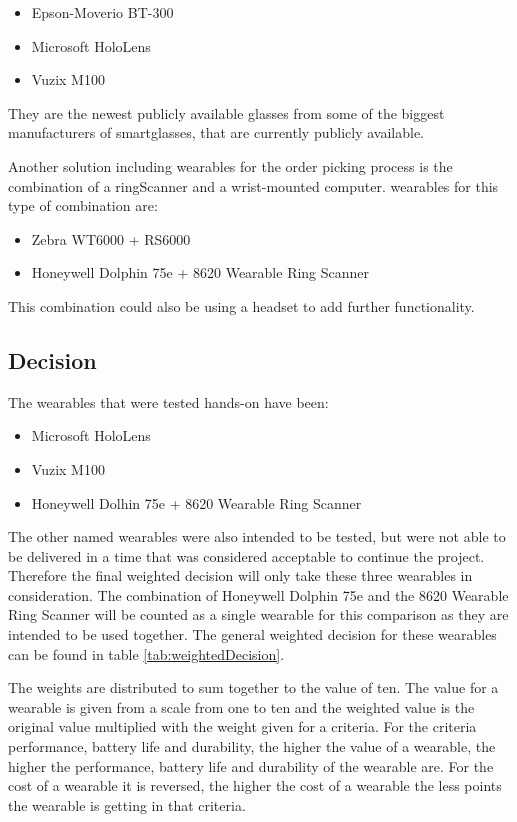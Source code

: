 \begin{itemize}
	\item Epson-Moverio BT-300
	\item Microsoft HoloLens
	\item Vuzix M100
\end{itemize}

They are the newest publicly available glasses from some of the biggest manufacturers of \gls{smartglasses}, that are currently publicly available.

Another solution including wearables for the order picking process is the combination of a \gls{ringScanner} and a wrist-mounted computer. \Gls{wearable}s for this type of combination are:

\begin{itemize}
	\item Zebra WT6000 + RS6000
	\item Honeywell Dolphin 75e + 8620 Wearable Ring Scanner
\end{itemize}

This combination could also be using a headset to add further functionality.

\subsection{Decision}

The wearables that were tested hands-on have been:
\begin{itemize}
	\item Microsoft HoloLens
	\item Vuzix M100
	\item Honeywell Dolhin 75e + 8620 Wearable Ring Scanner
\end{itemize}

The other named wearables were also intended to be tested, but were not able to be delivered in a time that was considered acceptable to continue the project. Therefore the final weighted decision will only take these three wearables in consideration. The combination of Honeywell Dolphin 75e and the 8620 Wearable Ring Scanner will be counted as a single wearable for this comparison as they are intended to be used together. The general weighted decision for these wearables can be found in table \ref{tab:weightedDecision}. 

The weights are distributed to sum together to the value of ten. The value for a wearable is given from a scale from one to ten and the weighted value is the original value multiplied with the weight given for a criteria. For the criteria performance, battery life and durability, the higher the value of a wearable, the higher the performance, battery life and durability of the wearable are. For the cost of a wearable it is reversed, the higher the cost of a wearable the less points the wearable is getting in that criteria.

